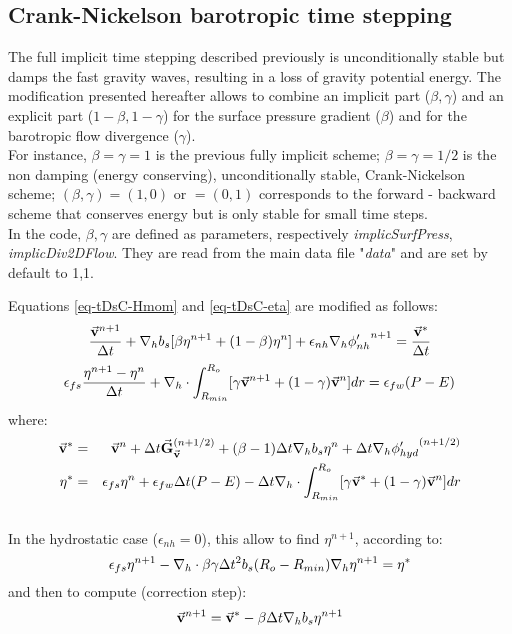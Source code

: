 \newpage
\subsection{Crank-Nickelson barotropic time stepping}

The full implicit time stepping described previously is unconditionally stable
but damps the fast gravity waves, resulting in a loss of 
gravity potential energy.
The modification presented hereafter allows to combine an implicit part
($\beta,\gamma$) and an explicit part ($1-\beta,1-\gamma$) for the surface
pressure gradient ($\beta$) and for the barotropic flow divergence ($\gamma$).
\\
For instance, $\beta=\gamma=1$ is the previous fully implicit scheme;
$\beta=\gamma=1/2$ is the non damping (energy conserving), unconditionally
stable, Crank-Nickelson scheme; $(\beta,\gamma)=(1,0)$ or $=(0,1)$
corresponds to the forward - backward scheme that conserves energy but is
only stable for small time steps.\\
In the code, $\beta,\gamma$ are defined as parameters, respectively 
{\it implicSurfPress}, {\it implicDiv2DFlow}. They are read from
the main data file "{\it data}" and are set by default to 1,1.

Equations \ref{eq-tDsC-Hmom} and \ref{eq-tDsC-eta} are modified as follows:
$$
\frac{ \vec{\bf v}^{n+1} }{ \Delta t }
+ {\bf \nabla}_h b_s [ \beta {\eta}^{n+1} + (1-\beta) {\eta}^{n} ] 
+ \epsilon_{nh} {\bf \nabla}_h {\phi'_{nh}}^{n+1}
 = \frac{ \vec{\bf v}^* }{ \Delta t }
$$
$$
\epsilon_{fs} \frac{ {\eta}^{n+1} - {\eta}^{n} }{ \Delta t}
+ {\bf \nabla}_h \cdot \int_{R_{min}}^{R_o} 
[ \gamma \vec{\bf v}^{n+1} + (1-\gamma) \vec{\bf v}^{n}] dr
= \epsilon_{fw} (P-E)
$$
where:
\begin{eqnarray*}
\vec{\bf v}^* & = &
\vec{\bf v} ^{n} + \Delta t \vec{\bf G}_{\vec{\bf v}} ^{(n+1/2)}
+ (\beta-1) \Delta t {\bf \nabla}_h b_s {\eta}^{n}
+ \Delta t {\bf \nabla}_h {\phi'_{hyd}}^{(n+1/2)}
\\
{\eta}^* & = &
\epsilon_{fs} {\eta}^{n} + \epsilon_{fw} \Delta t (P-E) 
- \Delta t {\bf \nabla}_h \cdot \int_{R_{min}}^{R_o} 
[ \gamma \vec{\bf v}^* + (1-\gamma) \vec{\bf v}^{n}] dr
\end{eqnarray*}
\\
In the hydrostatic case ($\epsilon_{nh}=0$),
this allow to find ${\eta}^{n+1}$, according to:
$$
\epsilon_{fs} {\eta}^{n+1} -
{\bf \nabla}_h \cdot \beta\gamma \Delta t^2 b_s (R_o - R_{min})
{\bf \nabla}_h {\eta}^{n+1}
= {\eta}^*
$$ 
and then to compute (correction step):
$$
\vec{\bf v}^{n+1} = \vec{\bf v}^{*}
- \beta \Delta t {\bf \nabla}_h b_s {\eta}^{n+1}
$$

